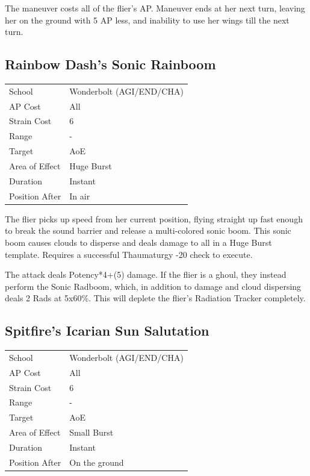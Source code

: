 \documentclass[11pt,a4paper,twocolumn]{book}
\begin{document}
The maneuver costs all of the flier's AP. Maneuver ends at her next turn, leaving her on the ground with 5 AP less, and inability to use her wings till the next turn.

\subsection*{Rainbow Dash's Sonic Rainboom}
{
	\begin{tabu} to 75mm{| X[l,4] | X[l,7] |}
		\hline
		School 			& Wonderbolt (AGI/END/CHA)		\\
        AP Cost	      	& All 				\\
        Strain Cost     & 6 				\\
        Range     		& - 				\\
        Target      	& AoE 				\\
        Area of Effect  & Huge Burst 	 	\\
        Duration     	& Instant 	 		\\
		Position After  & In air 			\\ \hline
	\end{tabu}
		
}

\medskip

The flier picks up speed from her current position, flying straight up fast enough to break the sound barrier and release a multi-colored sonic boom. This sonic boom causes clouds to disperse and deals damage to all in a Huge Burst template. Requires a successful Thaumaturgy -20 check to execute.

The attack deals Potency*4+(5) damage. If the flier is a ghoul, they instead perform the Sonic Radboom, which, in addition to damage and cloud dispersing deals 2 Rads at 5x60\%. This will deplete the flier's Radiation Tracker completely.

\subsection*{Spitfire's Icarian Sun Salutation}
{
	\begin{tabu} to 75mm{| X[l,4] | X[l,7] |}
		\hline
		School 			& Wonderbolt (AGI/END/CHA)		\\
        AP Cost	      	& All 		\\
        Strain Cost     & 6 				\\
        Range     		& - 				\\
        Target      	& AoE 				\\
        Area of Effect  & Small Burst 	 	\\
        Duration     	& Instant 	 		\\
		Position After  & On the ground 	\\ \hline
	\end{tabu}
		
}
\end{document}
